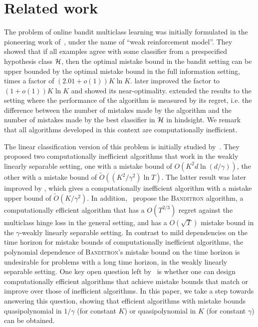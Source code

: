 \section{Related work}
\label{section:related-work}

The problem of online bandit multiclass learning was initially formulated in the
pioneering work of~\citet{Auer-Long-1999}, under the name of ``weak
reinforcement model''. They showed that if all examples agree with some
classifier from a prespecified hypothesis class $\mathcal{H}$, then the optimal
mistake bound in the bandit setting can be upper bounded by the optimal mistake
bound in the full information setting, times a factor of $(2.01 + o(1))K \ln K$.
\citet{Long-2017} later improved the factor to $(1 + o(1)) K \ln K$ and showed
its near-optimality. \citet{Daniely-Helbertal-2013} extended the results to the
setting where the performance of the algorithm is measured by its regret, i.e.
the difference between the number of mistakes made by the algorithm and the
number of mistakes made by the best classifier in $\mathcal{H}$ in hindsight.
We remark that
all algorithms developed in this context are computationally inefficient.

The linear classification version of this problem is initially studied
by~\citet{Kakade-Shalev-Shwartz-Tewari-2008}. They proposed two computationally
inefficient algorithms that work in the weakly linearly separable setting, one
with a mistake bound of
$O(K^2 d \ln(d/\gamma))$,
the other with a
mistake bound of $\widetilde{O}((K^2/\gamma^2) \ln T)$. The latter result
was later improved by \citet{Daniely-Helbertal-2013}, which gives a
computationally inefficient algorithm with a mistake upper bound of
$\widetilde{O}(K/\gamma^2)$.
In addition,~\citet{Kakade-Shalev-Shwartz-Tewari-2008} propose the
\textsc{Banditron} algorithm, a computationally efficient algorithm that has a
$O(T^{2/3})$ regret against the multiclass hinge loss in the general setting,
and has a $O(\sqrt{T})$ mistake bound in the $\gamma$-weakly linearly separable
setting.
In contrast to mild dependencies on the time horizon for mistake bounds of
computationally inefficient algorithms,
the polynomial dependence of \textsc{Banditron}'s mistake bound on the
time horizon is undesirable for problems with a long time horizon, in the
weakly linearly separable setting. One key open
question left by~\citet{Kakade-Shalev-Shwartz-Tewari-2008} is whether one can
design computationally efficient algorithms that achieve mistake bounds that
match or improve over those of inefficient algorithms. In this paper, we take a
step towards answering this question, showing that efficient algorithms with
mistake bounds quasipolynomial in $1/\gamma$ (for constant $K$)
or quasipolynomial in $K$ (for constant $\gamma$) can be obtained.

